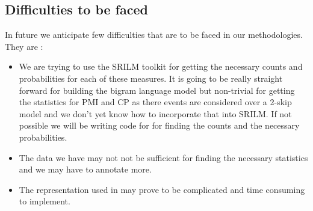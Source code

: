 \documentclass[11pt]{article}
\begin{document}
\subsection{Difficulties to be faced}
In future we anticipate few difficulties that are to be faced in our methodologies. They are : 
\begin{itemize}
\item  We are trying to use the SRILM toolkit for getting the necessary counts and probabilities for each of these measures. It is going to be really straight forward for building the bigram language model but non-trivial for getting the statistics for PMI and CP as there events are considered over a 2-skip model and we don’t yet know how to incorporate that into SRILM. If not possible we will be writing code for for finding the counts and the necessary probabilities.
\item The data we have may not not be sufficient for finding the necessary statistics and we may have to annotate more.
\item The representation used in \cite{mooney} may prove to be complicated and time consuming to implement.
\end{itemize}
 
\end{document}
